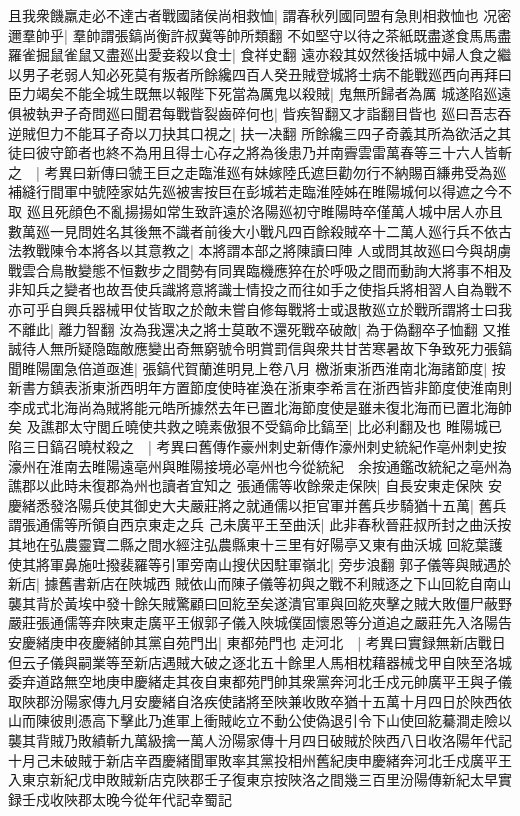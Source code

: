 且我衆饑羸走必不達古者戰國諸侯尚相救恤|{
	謂春秋列國同盟有急則相救恤也}
况密邇羣帥乎|{
	羣帥謂張鎬尚衡許叔冀等帥所類翻}
不如堅守以待之茶紙既盡遂食馬馬盡羅雀掘鼠雀鼠又盡廵出愛妾殺以食士|{
	食祥史翻}
遠亦殺其奴然後括城中婦人食之繼以男子老弱人知必死莫有叛者所餘纔四百人癸丑賊登城將士病不能戰廵西向再拜曰臣力竭矣不能全城生既無以報陛下死當為厲鬼以殺賊|{
	鬼無所歸者為厲}
城遂陷廵遠俱被執尹子奇問廵曰聞君每戰眥裂齒碎何也|{
	眥疾智翻又才詣翻目眥也}
廵曰吾志吞逆賊但力不能耳子奇以刀抉其口視之|{
	扶一决翻}
所餘纔三四子奇義其所為欲活之其徒曰彼守節者也終不為用且得士心存之將為後患乃并南霽雲雷萬春等三十六人皆斬之　|{
	考異曰新傳曰虢王巨之走臨淮廵有妹嫁陸氏遮巨勸勿行不納賜百縑弗受為廵補縫行間軍中號陸家姑先廵被害按巨在彭城若走臨淮陸姊在睢陽城何以得遮之今不取}
廵且死顔色不亂揚揚如常生致許遠於洛陽廵初守睢陽時卒僅萬人城中居人亦且數萬廵一見問姓名其後無不識者前後大小戰凡四百餘殺賊卒十二萬人廵行兵不依古法教戰陳令本將各以其意教之|{
	本將謂本部之將陳讀曰陣}
人或問其故廵曰今與胡虜戰雲合鳥散變態不恒數步之間勢有同異臨機應猝在於呼吸之間而動詢大將事不相及非知兵之變者也故吾使兵識將意將識士情投之而往如手之使指兵將相習人自為戰不亦可乎自興兵器械甲仗皆取之於敵未嘗自修每戰將士或退散廵立於戰所謂將士曰我不離此|{
	離力智翻}
汝為我還决之將士莫敢不還死戰卒破敵|{
	為于偽翻卒子恤翻}
又推誠待人無所疑隐臨敵應變出奇無窮號令明賞罰信與衆共甘苦寒暑故下争致死力張鎬聞睢陽圍急倍道亟進|{
	張鎬代賀蘭進明見上卷八月}
檄浙東浙西淮南北海諸節度|{
	按新書方鎮表浙東浙西明年方置節度使時崔渙在浙東李希言在浙西皆非節度使淮南則李成式北海尚為賊將能元皓所據然去年已置北海節度使是雖未復北海而已置北海帥矣}
及譙郡太守閭丘曉使共救之曉素傲狠不受鎬命比鎬至|{
	比必利翻及也}
睢陽城已陷三日鎬召曉杖殺之　|{
	考異曰舊傳作豪州刺史新傳作濠州刺史統紀作亳州刺史按濠州在淮南去睢陽遠亳州與睢陽接境必亳州也今從統紀　余按通鑑改統紀之亳州為譙郡以此時未復郡為州也讀者宜知之}
張通儒等收餘衆走保陜|{
	自長安東走保陜}
安慶緒悉發洛陽兵使其御史大夫嚴莊將之就通儒以拒官軍并舊兵步騎猶十五萬|{
	舊兵謂張通儒等所領自西京東走之兵}
己未廣平王至曲沃|{
	此非春秋晉莊叔所封之曲沃按其地在弘農靈寶二縣之間水經注弘農縣東十三里有好陽亭又東有曲沃城}
回紇葉護使其將軍鼻施吐撥裴羅等引軍旁南山搜伏因駐軍嶺北|{
	旁步浪翻}
郭子儀等與賊遇於新店|{
	據舊書新店在陜城西}
賊依山而陳子儀等初與之戰不利賊逐之下山回紇自南山襲其背於黃埃中發十餘矢賊驚顧曰回紇至矣遂潰官軍與回紇夾擊之賊大敗僵尸蔽野嚴莊張通儒等弃陜東走廣平王俶郭子儀入陜城僕固懷恩等分道追之嚴莊先入洛陽告安慶緒庚申夜慶緒帥其黨自苑門出|{
	東都苑門也}
走河北　|{
	考異曰實録無新店戰日但云子儀與嗣業等至新店遇賊大破之逐北五十餘里人馬相枕藉器械戈甲自陜至洛城委弃道路無空地庚申慶緒走其夜自東都苑門帥其衆黨奔河北壬戍元帥廣平王與子儀取陜郡汾陽家傳九月安慶緒自洛疾使諸將至陜兼收敗卒猶十五萬十月四日於陜西依山而陳彼則憑高下擊此乃進軍上衝賊屹立不動公使偽退引令下山使回紇驀澗走險以襲其背賊乃敗績斬九萬級擒一萬人汾陽家傳十月四日破賊於陜西八日收洛陽年代記十月己未破賊于新店辛酉慶緒聞軍敗率其黨投相州舊紀庚申慶緒奔河北壬戍廣平王入東京新紀戊申敗賊新店克陜郡壬子復東京按陜洛之間幾三百里汾陽傳新紀太早實録壬戍收陜郡太晚今從年代記幸蜀記}
